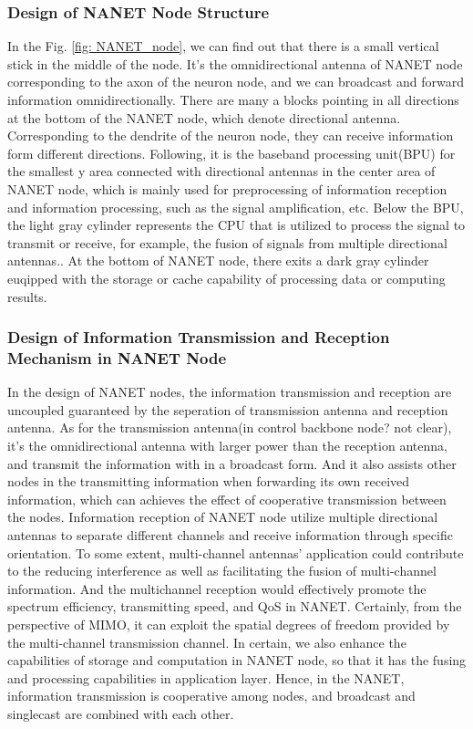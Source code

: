 \documentclass[journal,comsoc]{IEEEtran}
\begin{document}
			\subsubsection{Design of NANET Node Structure}
				In the Fig. \ref{fig: NANET_node}, we can find out that there is a small vertical stick in the middle of the node. 
				It's the omnidirectional antenna of NANET node corresponding to the axon of the neuron node, and we can broadcast and forward information omnidirectionally.
				There are many a blocks pointing in all directions at the bottom of the NANET node, which denote directional antenna. 
				Corresponding to the dendrite of the neuron node, they can receive information form different directions.
				Following, it is the baseband processing unit(BPU) for the smallest y area connected with directional antennas in the center area of NANET node,
				which is mainly used for preprocessing of information reception and information processing, such as the signal amplification, etc.
				Below the BPU, the light gray cylinder represents the CPU that is utilized to process the signal to transmit or receive, for example, the fusion of signals from multiple directional antennas..
				At the bottom of NANET node, there exits a dark gray cylinder euqipped with the storage or cache capability of processing data or computing results.

			\subsubsection{Design of Information Transmission and Reception Mechanism in NANET Node}
				In the design of NANET nodes, the information transmission and reception are uncoupled guaranteed by the seperation of transmission antenna and reception antenna.
				As for the transmission antenna(in control backbone node? not clear), it's the omnidirectional antenna with larger power than the reception antenna, and transmit the information with in a broadcast form. 
				And it also assists other nodes in the transmitting information when forwarding its own received information, which can achieves the effect of cooperative transmission between the nodes.
				Information reception of NANET node utilize multiple directional antennas to separate different channels and receive information through specific orientation. 
				To some extent, multi-channel antennas' application could contribute to the reducing interference as well as facilitating the fusion of multi-channel information.
				And the multichannel reception would effectively promote the spectrum efficiency, transmitting speed, and QoS in NANET.
				Certainly, from the perspective of MIMO, it can exploit the spatial degrees of freedom provided by the multi-channel transmission channel.
				In certain, we also enhance the capabilities of storage and computation  in NANET node, so that it has the fusing and processing capabilities in application layer.
				Hence, in the NANET, information transmission is cooperative among nodes,  and broadcast and singlecast are combined with each other.
				
\end{document}
